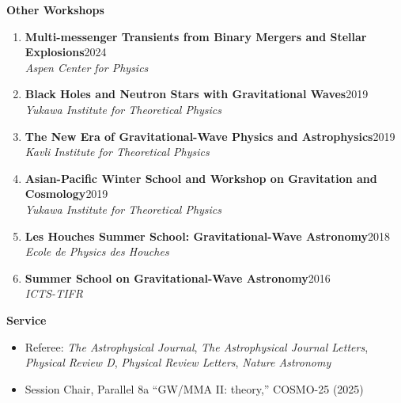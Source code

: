 \documentclass[letterpaper,10pt]{article}
\newcommand{\resheading}[1]{{\large \colorbox{mygrey}{\begin{minipage}{\dimexpr\textwidth-2\fboxsep\relax}{\textbf{#1 \vphantom{p\^{E}}}}\end{minipage}}}}
\newcommand{\presentation}[3]{%
\textbf{#1}\hfill #2\\
\textit{#3}}
\begin{document}
%
\resheading{Other Workshops}
\begin{enumerate}
\item
	\presentation{Multi-messenger Transients from Binary Mergers and Stellar Explosions}{2024}{Aspen Center for Physics}
\item
	\presentation{Black Holes and Neutron Stars with Gravitational Waves}{2019}{Yukawa Institute for Theoretical Physics}
\item
	\presentation{The New Era of Gravitational-Wave Physics and Astrophysics}{2019}{Kavli Institute for Theoretical Physics}
\item
	\presentation{Asian-Pacific Winter School and Workshop on Gravitation and Cosmology}{2019}{Yukawa Institute for Theoretical Physics}
\item
	\presentation{Les Houches Summer School: Gravitational-Wave Astronomy}{2018}{Ecole de Physics des Houches}
\item
	\presentation{Summer School on Gravitational-Wave Astronomy}{2016}{ICTS-TIFR}
	
\end{enumerate}

\resheading{Service}
\begin{itemize}
\item Referee: \textit{The Astrophysical Journal}, \textit{The Astrophysical Journal Letters}, \textit{Physical Review D}, \textit{Physical Review Letters}, \textit{Nature Astronomy}
\item Session Chair, Parallel 8a ``GW/MMA II: theory,'' COSMO-25 (2025)
\end{itemize}
\end{document}
